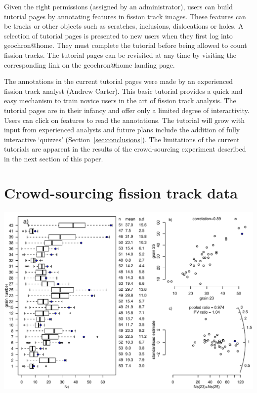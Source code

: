 \documentclass[gchron, manuscript]{copernicus}
\begin{document}
Given the right permissions (assigned by an administrator), users can
build tutorial pages by annotating features in fission track images.
These features can be tracks or other objects such as scratches,
inclusions, dislocations or holes. A selection of tutorial pages is
presented to new users when they first log into
geochron@home. They must complete the tutorial before being
allowed to count fission tracks.  The tutorial pages can be revisited
at any time by visiting the corresponding link on the
geochron@home landing page.\medskip

The annotations in the current tutorial pages were made by an
experienced fission track analyst (Andrew Carter). This basic tutorial
provides a quick and easy mechanism to train novice users in the art
of fission track analysis. The tutorial pages are in their infancy
and offer only a limited degree of interactivity. Users can click on
features to read the annotations. The tutorial will grow with input
from experienced analysts and future plans include the addition of
fully interactive `quizzes' (Section~\ref{sec:conclusions}). The
limitations of the current tutorials are apparent in the results of
the crowd-sourcing experiment described in the next section of this
paper.

\section{Crowd-sourcing fission track data}\label{sec:crowdsourcing}

{ \centering \includegraphics[width=15cm]{radialcrowd.pdf}
  \label{fig:radialcrowd}
}%
\end{document}
